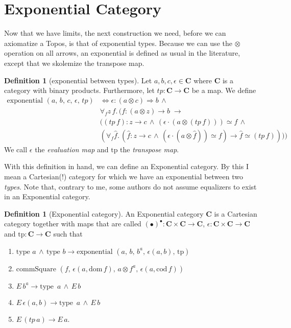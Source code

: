 \documentclass[a4paper, 11pt]{article}
\theoremstyle{definition}
\newtheorem{definition}[theorem]{Definition}
\newcommand{\cat}{%
	\mathbf %
}
\newcommand{\domain}[ 1 ]{%
	\mathrm{dom} \, #1 %
}
\newcommand{\codomain}[ 1 ]{%
	\mathrm{cod} \, #1%
}
\newcommand{\notion}[1]{\text{#1 }}
\newcommand{\commSquare}[4]{\notion{commSquare} (#1, \, #2, \, #3, \, #4)}
\newcommand{\expon}[5]{\notion{exponential} (#1, \, #2, \, #3, \, #4, \, #5)}
\begin{document}
\section{Exponential Category}

Now that we have limits, the next construction we need, before we can axiomatize a Topos, is that of exponential types. Because we can use the $\otimes$ operation on all arrows, an exponential is defined as usual in the literature, except that we skolemize the transpose map.

\begin{definition}[exponential between types]
	Let $a, b, c, \epsilon \in \cat C$ where $\cat C$ is a category with binary products. Furthermore, let $tp: \cat C \to \cat C$ be a map. We define
	\begin{align*}
		\expon{a}{b}{c}{\epsilon}{tp} & \Longleftrightarrow \epsilon:(a \otimes c) \Rightarrow b \, \wedge \\
		& \forall_f z \, f. \, (f:(a \otimes z) \rightarrow b \; \longrightarrow \\ 
		&((tp \, f):z \rightarrow c \, \wedge \, (\epsilon \cdot (a \otimes (tp \, f))) \simeq f \, \wedge \\
		& (\forall_f \hat{f}. \, (\hat{f}:z \rightarrow c \, \wedge \, (\epsilon \cdot (a \otimes \hat{f})) \simeq f) \longrightarrow \hat{f} \simeq (tp \, f))))
	\end{align*}
	We call $\epsilon$ the \emph{evaluation map} and $\text{tp}$ the \emph{transpose map}.
\end{definition}

With this definition in hand, we can define an Exponential category. By this I mean a Cartesian(!) category for which we have an exponential between two \emph{types}. Note that, contrary to me, some authors do not assume equalizers to exist in an Exponential category.


\begin{definition}[Exponential category]
	An Exponential category $\cat C$ is a Cartesian category together with maps that are called $(\bullet)^{\bullet}: \cat C \times \cat C \to \cat C$, $\epsilon: \cat C \times \cat C \to \cat C$ and $\text{tp}: \cat C \to \cat C$ such that
	\begin{enumerate}
		\item $\notion{type} a \, \wedge \, \notion{type} b \longrightarrow \expon{a}{b}{b^{a}}{\epsilon(a , b)}{\text{tp}}$
		\item $\commSquare{f}{\epsilon(a, \domain{f})}{a \otimes f^{a}}{\epsilon(a, \codomain{f})}$
		\item $E \, b^{a} \longrightarrow \notion{type} \, a \, \wedge \, E\, b $
		\item $E \, \epsilon(a, b) \longrightarrow \notion{type} \, a \, \wedge \, E \, b$
		\item $E \, (tp\, a) \longrightarrow E \, a$.
	\end{enumerate}
\end{definition}
\end{document}
